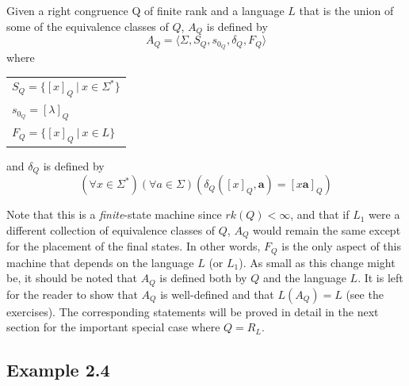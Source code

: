 \begin{dfn}\label{dfn-2.5}
Given a right congruence Q of finite rank and a language $L$ that is the union
of some of the equivalence classes of $Q$, $A_Q$ is defined by
\[ A_Q =\langle\Sigma,S_Q,s_{0_Q},\delta_Q,F_Q\rangle \]
where
\begin{center}\begin{tabular}{l}
$S_Q =\{[x]_Q\ |\ x \in \Sigma^*\}$ \\
$s_{0_Q} = [\lambda]_Q$ \\
$F_Q =\{[x]_Q\ |\ x \in L\}$
\end{tabular}\end{center}
and $\delta_Q$ is defined by
\[ (\forall x \in \Sigma^*)(\forall a \in \Sigma)(\delta_Q([x]_Q,\pmb{a}) =
	[x\pmb{a}]_Q) \]
\end{dfn}

Note that this is a \emph{finite}-state machine since $rk(Q) < \infty$, and that
if $L_1$ were a different collection of equivalence classes of $Q$, $A_Q$ would
remain the same except for the placement of the final states. In other words,
$F_Q$ is the only aspect of this machine that depends on the language $L$ (or
$L_1$). As small as this change might be, it should be noted that $A_Q$ is
defined both by $Q$ and the language $L$. It is left for the reader to show that
$A_Q$ is well-defined and that $L(A_Q)=L$ (see the exercises). The corresponding
statements will be proved in detail in the next section for the important
special case where $Q = R_L$.

\subsection*{Example 2.4}

